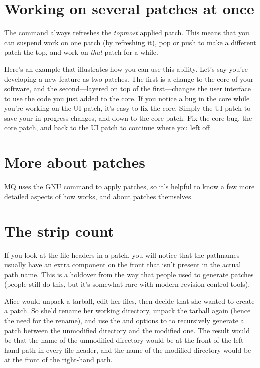 \section{Working on several patches at once}

The  command always refreshes the \emph{topmost}
applied patch.  This means that you can suspend work on one patch (by
refreshing it), pop or push to make a different patch the top, and
work on \emph{that} patch for a while.

Here's an example that illustrates how you can use this ability.
Let's say you're developing a new feature as two patches.  The first
is a change to the core of your software, and the second---layered on
top of the first---changes the user interface to use the code you just
added to the core.  If you notice a bug in the core while you're
working on the UI patch, it's easy to fix the core.  Simply
 the UI patch to save your in-progress changes, and
 down to the core patch.  Fix the core bug,
 the core patch, and  back to the UI
patch to continue where you left off.

\section{More about patches}
\label{sec:mq:adv-patch}

MQ uses the GNU  command to apply patches, so it's
helpful to know a few more detailed aspects of how 
works, and about patches themselves.

\section{The strip count}

If you look at the file headers in a patch, you will notice that the
pathnames usually have an extra component on the front that isn't
present in the actual path name.  This is a holdover from the way that
people used to generate patches (people still do this, but it's
somewhat rare with modern revision control tools).  

Alice would unpack a tarball, edit her files, then decide that she
wanted to create a patch.  So she'd rename her working directory,
unpack the tarball again (hence the need for the rename), and use the
 and  options to  to
recursively generate a patch between the unmodified directory and the
modified one.  The result would be that the name of the unmodified
directory would be at the front of the left-hand path in every file
header, and the name of the modified directory would be at the front
of the right-hand path.

